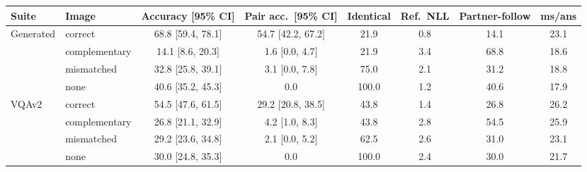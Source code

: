 \documentclass{article}
\begin{document}
\begin{table}[t]\centering\footnotesize\setlength{\tabcolsep}{4pt}
\begin{adjustbox}{max width=\linewidth}\begin{tabular}{llcccccc}\toprule
Suite & Image & Accuracy [95\% CI] & Pair acc.\ [95\% CI] & Identical & Ref.\ NLL & Partner-follow & ms/ans \\\midrule
Generated & correct       & 68.8 [59.4, 78.1] & 54.7 [42.2, 67.2] & 21.9  & 0.8 & 14.1 & 23.1 \\
          & complementary & 14.1 [8.6, 20.3]  & 1.6 [0.0, 4.7]    & 21.9  & 3.4 & 68.8 & 18.6 \\
          & mismatched    & 32.8 [25.8, 39.1] & 3.1 [0.0, 7.8]    & 75.0  & 2.1 & 31.2 & 18.8 \\
          & none          & 40.6 [35.2, 45.3] & 0.0               & 100.0 & 1.2 & 40.6 & 17.9 \\\midrule
VQAv2     & correct       & 54.5 [47.6, 61.5] & 29.2 [20.8, 38.5] & 43.8  & 1.4 & 26.8 & 26.2 \\
          & complementary & 26.8 [21.1, 32.9] & 4.2 [1.0, 8.3]    & 43.8  & 2.8 & 54.5 & 25.9 \\
          & mismatched    & 29.2 [23.6, 34.8] & 2.1 [0.0, 5.2]    & 62.5  & 2.6 & 31.0 & 23.1 \\
          & none          & 30.0 [24.8, 35.3] & 0.0               & 100.0 & 2.4 & 30.0 & 21.7 \\\bottomrule
\end{tabular}\end{adjustbox}


\end{table}
\end{document}
